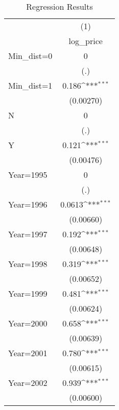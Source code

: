 {
\def\sym#1{\ifmmode^{#1}\else\(^{#1}\)\fi}
\begin{longtable}{l*{1}{c}}
\caption{Regression Results}\\
\toprule\endfirsthead\midrule\endhead\midrule\endfoot\endlastfoot
                    &\multicolumn{1}{c}{(1)}\\
                    &\multicolumn{1}{c}{log\_price}\\
\midrule
Min\_dist=0          &           0         \\
                    &         (.)         \\
\addlinespace
Min\_dist=1          &       0.186\sym{***}\\
                    &   (0.00270)         \\
\addlinespace
N                   &           0         \\
                    &         (.)         \\
\addlinespace
Y                   &       0.121\sym{***}\\
                    &   (0.00476)         \\
\addlinespace
Year=1995           &           0         \\
                    &         (.)         \\
\addlinespace
Year=1996           &      0.0613\sym{***}\\
                    &   (0.00660)         \\
\addlinespace
Year=1997           &       0.192\sym{***}\\
                    &   (0.00648)         \\
\addlinespace
Year=1998           &       0.319\sym{***}\\
                    &   (0.00652)         \\
\addlinespace
Year=1999           &       0.481\sym{***}\\
                    &   (0.00624)         \\
\addlinespace
Year=2000           &       0.658\sym{***}\\
                    &   (0.00639)         \\
\addlinespace
Year=2001           &       0.780\sym{***}\\
                    &   (0.00615)         \\
\addlinespace
Year=2002           &       0.939\sym{***}\\
                    &   (0.00600)         \\

\end{longtable}}
